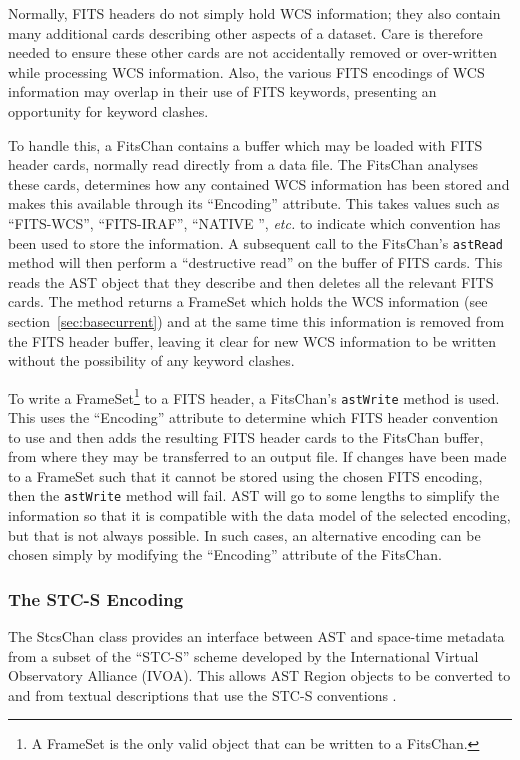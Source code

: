 \documentclass[final,authoryear,5p,times,twocolumn]{elsarticle}
\begin{document}
Normally, FITS headers do not simply hold WCS information; they also
contain many additional cards describing other aspects of a dataset. Care
is therefore needed to ensure these other cards are not accidentally
removed or over-written while processing WCS information. Also, the
various FITS encodings of WCS information may overlap in their use of
FITS keywords, presenting an opportunity for keyword clashes.

To handle this, a FitsChan contains a buffer which may be loaded with
FITS header cards, normally read directly from a data file. The FitsChan
analyses these cards, determines how any contained WCS information has
been stored and makes this available through its ``Encoding'' attribute.
This takes values such as ``FITS-WCS'', ``FITS-IRAF'', ``NATIVE '',
\emph{etc.} to
indicate which convention has been used to store the information. A
subsequent call to the FitsChan's \texttt{astRead} method will then perform a
``destructive read'' on the buffer of FITS cards. This reads the AST object
that they describe and then deletes all the relevant FITS cards. The
method returns a FrameSet which holds the WCS information (see
section~\ref{sec:basecurrent}) and at the same time this information is
removed from the FITS header buffer, leaving it clear for new WCS
information to be written without the possibility of any keyword clashes.

To write a FrameSet\footnote{A FrameSet is the only valid object that
can be written to a FitsChan.} to a FITS header, a FitsChan's
\texttt{astWrite}
method is used. This uses the ``Encoding'' attribute to determine which
FITS header convention to use and then adds the resulting FITS header
cards to the FitsChan buffer, from where they may be transferred to an
output file. If changes have been made to a FrameSet such that it cannot
be stored using the chosen FITS encoding, then the \texttt{astWrite} method will
fail. AST will go to some lengths to simplify the information so that it
is compatible with the data model of the selected encoding, but that is
not always possible. In such cases, an alternative encoding can be chosen
simply by modifying the ``Encoding'' attribute of the FitsChan.

\subsubsection{The STC-S Encoding}
The StcsChan class provides an interface between AST and space-time
metadata from a subset of the ``STC-S'' scheme \citep{STC} developed by the
International Virtual Observatory Alliance (IVOA). This allows AST
Region objects to be converted to and from textual descriptions that
use the STC-S conventions .
\end{document}
